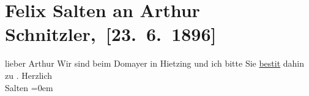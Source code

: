 

         
         \renewcommand{\erwaehntePersonen}{Personen: Felix Salten, Ottilie Salten}
         \renewcommand{\erwaehnteOrte}{Orte: Café Dommayer, Wien, XIII., Hietzing}
         \renewcommand{\erwaehnteWerke}{}
               \section[ Felix Salten an Arthur Schnitzler, {[}23. 6. 1896{]}]{ Felix Salten an Arthur Schnitzler, {[}23. 6. 1896{]}}\nopagebreak{}\rehead{ }\begin{ledgroupsized}[t]{13cm}\normalsize\beginnumbering \toendnotes[C]{\smallbreak\pagebreak[2]} 
\toendnotes[C]{\smallbreak}\pstart{}{\pb}lieber Arthur\pend\pstart
           Wir sind beim Domayer in Hietzing und ich bitte Sie \uline{besti{\geminationm}t} dahin zu \label{K_L03173-1v}\label{K_L03173-1h}.\pend
           \pstart
           Herzlich {\\[\baselineskip]}\spacefill\mbox{Salten}\pend
           \leftskip=0em{}
         
         \endnumbering{}\end{ledgroupsized}  \newcommand{\dateiname}{L03173}\newcommand{\titel}{Felix Salten an Arthur Schnitzler, [23. 6. 1896]}\newcommand{\editorInnen}{Martin Anton Müller und Laura Untner}
      